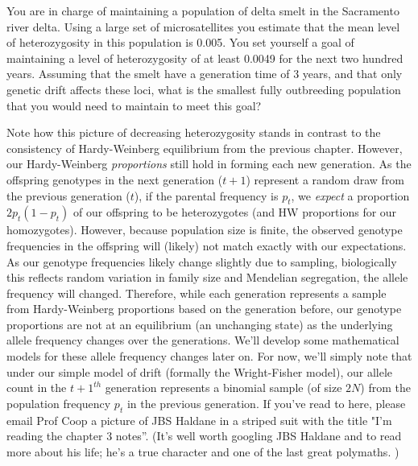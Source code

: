 \begin{question} You are in charge of maintaining a population of delta smelt in the Sacramento river delta. Using a large set of microsatellites you
  estimate that the mean level of heterozygosity in this population is 0.005.
  You set yourself a goal of maintaining a level of heterozygosity of at least
  0.0049 for the next two hundred years. Assuming that the smelt have a
  generation time of 3 years, and that only genetic drift affects these loci, what is the smallest fully outbreeding population that you would need to maintain to meet this goal?
\end{question}

Note how this picture of decreasing heterozygosity stands in contrast to the
consistency of Hardy-Weinberg equilibrium from the previous chapter.
However, our Hardy-Weinberg \emph{proportions} still hold in forming each new generation. As the offspring genotypes in the next generation ($t+1$) represent a random
draw from the previous generation ($t$), if the parental frequency is $p_t$, we \emph{expect} a proportion $2p_t(1-p_t)$ of our offspring to be
heterozygotes (and HW proportions for our homozygotes). However, because population size is finite, the
observed genotype frequencies in the offspring will (likely) not match exactly with our expectations. As our genotype frequencies likely change slightly due
to sampling, biologically this reflects random variation in family size
and Mendelian segregation, the allele frequency will changed. Therefore, while each generation represents a sample from
Hardy-Weinberg proportions based on the generation before, our
genotype proportions are not at an equilibrium (an unchanging state) as the
underlying allele frequency changes over the generations. We'll develop some mathematical models for these allele
frequency changes later on. For now, we'll simply note that
under our simple model of drift (formally the Wright-Fisher model), our
allele count in the $t+1^{th}$ generation represents a binomial sample
(of size $2N$) from the population frequency $p_t$ in the previous
generation.  If you've read to here, please email Prof Coop a picture of JBS Haldane in a striped suit with the title "I'm reading the chapter 3 notes''. (It's well worth googling JBS Haldane and to read more about his life; he's a true character and one of the last great polymaths. )



